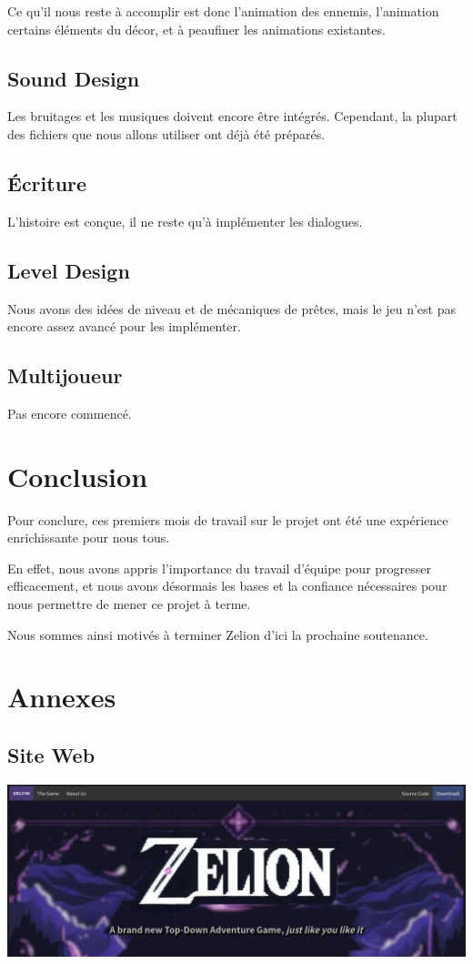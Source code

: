 \documentclass[a4page, 14pt]{extarticle}
\begin{document}
{{    Ce qu'il nous reste à accomplir est donc l'animation des ennemis, l'animation certains éléments du décor, et à peaufiner les animations existantes.
    }
    \subsection{Sound Design} {
Les bruitages et les musiques doivent encore être intégrés. Cependant, la plupart des fichiers que nous allons utiliser ont déjà été préparés.
    }
    \subsection{Écriture}{
    L'histoire est conçue, il ne reste qu'à implémenter les dialogues.
    }
    \subsection{Level Design} {
    Nous avons des idées de niveau et de mécaniques de prêtes, mais le jeu n'est pas encore assez avancé pour les implémenter. 
    }
    \subsection{Multijoueur} {
    Pas encore commencé.
    }
}
\section{Conclusion} {
    
Pour conclure, ces premiers mois de travail sur le projet ont été une expérience enrichissante pour nous tous.

En effet, nous avons appris l'importance du travail d'équipe pour progresser efficacement, et nous avons désormais les bases et la confiance nécessaires pour nous permettre de mener ce projet à terme.

Nous sommes ainsi motivés à terminer Zelion d'ici la prochaine soutenance.
}

\section{Annexes}
    \subsection{Site Web}
        \begin{center}
        \includegraphics[width=1\textwidth]{images/WebsiteScreenshot1.png}
    \end{center}
\end{document}
